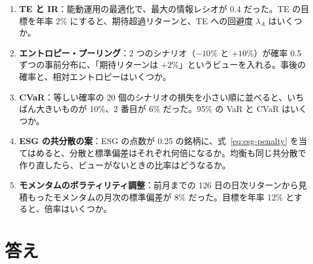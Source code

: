\begin{enumerate}[label=\textbf{問 \arabic*.},leftmargin=3.2em]
\item \textbf{TE と IR}：能動運用の最適化で、最大の情報レシオが 0.4 だった。TE の目標を年率 2\% にすると、期待超過リターンと、TE への回避度 $\lambda_A$ はいくつか。

\item \textbf{エントロピー・プーリング}：2 つのシナリオ（$-10\%$ と $+10\%$）が確率 0.5 ずつの事前分布に、「期待リターンは $+2\%$」というビューを入れる。事後の確率と、相対エントロピーはいくつか。

\item \textbf{CVaR}：等しい確率の 20 個のシナリオの損失を小さい順に並べると、いちばん大きいものが 10\%、2 番目が 6\% だった。95\% の VaR と CVaR はいくつか。

\item \textbf{ESG の共分散の案}：ESG の点数が 0.25 の銘柄に、式~\eqref{eq:esg-penalty} を当てはめると、分散と標準偏差はそれぞれ何倍になるか。均衡も同じ共分散で作り直したら、ビューがないときの比率はどうなるか。

\item \textbf{モメンタムのボラティリティ調整}：前月までの 126 日の日次リターンから見積もったモメンタムの月次の標準偏差が 8\% だった。目標を年率 12\% とすると、倍率はいくつか。
\end{enumerate}

\section{答え}

